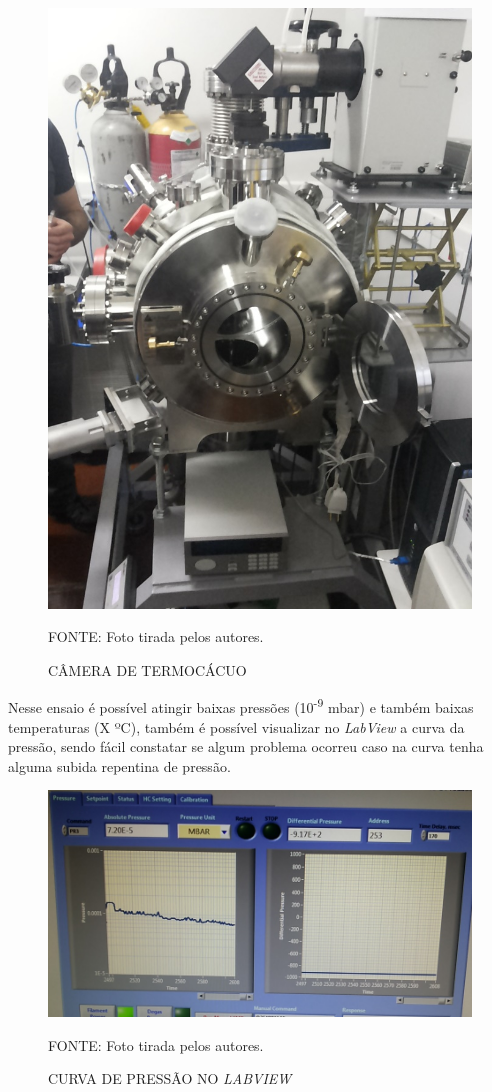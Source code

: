 \documentclass[
	12pt,				%
	openright,			%
	oneside,			%
	a4paper,			%
	english,			%
	french,				%
	spanish,			%
	brazil,				%
	oldfontcommands
	]{abntex2}
\begin{document}
	\begin{figure}[th]
		\caption{CÂMERA DE TERMOCÁCUO}
		\label{Fig_SubConj}
		\centering
		\includegraphics[width=0.5\linewidth]{./figs/termovacuo}
			
		\begin{small}
			FONTE: Foto tirada pelos autores.
		\end{small}		
	\end{figure}
	
	Nesse ensaio é possível atingir baixas pressões (10\textsuperscript{-9} mbar) e também baixas temperaturas (X ºC), também é possível visualizar no \textit{LabView} a curva da pressão, sendo fácil constatar se algum problema ocorreu caso na curva tenha alguma subida repentina de pressão.
	
	\begin{figure}[th]
		\caption{CURVA DE PRESSÃO NO \textit{LABVIEW}}
		\label{Fig_SubConj}
		\centering
		\includegraphics[width=1.0\linewidth]{./figs/labview}
			
		\begin{small}
			FONTE: Foto tirada pelos autores.
		\end{small}		
	\end{figure}
	
\end{document}
